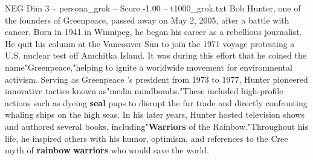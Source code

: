 \begin{textsample}{NEG Dim 3 – persona\_grok – Score -1.00 – t1000\_grok.txt}  \label{ex:f3_neg_021}
Bob Hunter, one of the founders of Greenpeace, passed away on May 2, 2005, after a battle with cancer.
Born in 1941 in Winnipeg, he began his career as a rebellious journalist.
He quit his column at the Vancouver Sun to join the 1971 voyage protesting a U.S. nuclear test off Amchitka Island.
It was during this effort that he coined the name"Greenpeace,"helping to ignite a worldwide movement for environmental activism.
Serving as Greenpeace 's president from 1973 to 1977, Hunter pioneered innovative tactics known as"media mindbombs."These included high-profile actions such as dyeing \textbf{seal} pups to disrupt the fur trade and directly confronting whaling ships on the high seas.
In his later years, Hunter hosted television shows and authored several books, including"\textbf{Warriors} of the Rainbow."Throughout his life, he inspired others with his humor, optimism, and references to the Cree myth of \textbf{rainbow} \textbf{warriors} who would save the world.

\end{textsample}
